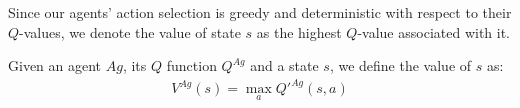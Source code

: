 Since our agents' action selection is greedy and deterministic with respect to
their $Q$-values, we denote the value of state $s$ as the highest
$Q$-value associated with it.
 \begin{definition}
    Given an agent $Ag$, its $Q$ function $Q^{Ag}$ and a state $s$, we define
    the value of $s$ as:
    \begin{align}
       V^{Ag}(s) = \max_a {Q'}^{Ag}(s,a)
    \end{align}
 \end{definition} 





